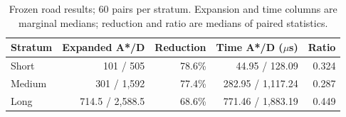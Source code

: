\begin{table}[!htbp]
\caption{Frozen road results; 60 pairs per stratum. Expansion and time columns are marginal medians; reduction and ratio are medians of paired statistics.}\label{tab:road}
\centering\begin{tabular}{lrrrr}\toprule
Stratum & Expanded A*/D & Reduction & Time A*/D ($\mu$s) & Ratio\\\midrule
Short &101 / 505&78.6\%&44.95 / 128.09&0.324\\
Medium &301 / 1,592&77.4\%&282.95 / 1,117.24&0.287\\
Long &714.5 / 2,588.5&68.6\%&771.46 / 1,883.19&0.449\\\bottomrule
\end{tabular}
\end{table}

